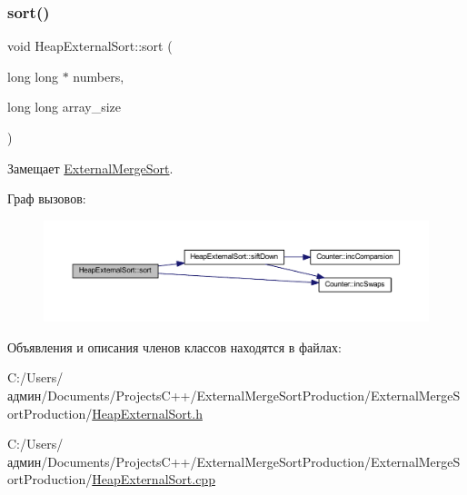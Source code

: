 \subsubsection{\texorpdfstring{sort()}{sort()}}
{\footnotesize\ttfamily void Heap\+External\+Sort\+::sort (\begin{DoxyParamCaption}\item[{long long $\ast$}]{numbers,  }\item[{long long}]{array\+\_\+size }\end{DoxyParamCaption})\hspace{0.3cm}{\ttfamily [virtual]}}



Замещает \hyperlink{class_external_merge_sort_af6412221cc797a846243a343ccc12dba}{External\+Merge\+Sort}.

Граф вызовов\+:\nopagebreak
\begin{figure}[H]
\begin{center}
\leavevmode
\includegraphics[width=350pt]{class_heap_external_sort_a908087ce13932b268a35e1184a05ea44_cgraph}
\end{center}
\end{figure}


Объявления и описания членов классов находятся в файлах\+:\begin{DoxyCompactItemize}
\item 
C\+:/\+Users/админ/\+Documents/\+Projects\+C++/\+External\+Merge\+Sort\+Production/\+External\+Merge\+Sort\+Production/\hyperlink{_heap_external_sort_8h}{Heap\+External\+Sort.\+h}\item 
C\+:/\+Users/админ/\+Documents/\+Projects\+C++/\+External\+Merge\+Sort\+Production/\+External\+Merge\+Sort\+Production/\hyperlink{_heap_external_sort_8cpp}{Heap\+External\+Sort.\+cpp}\end{DoxyCompactItemize}
